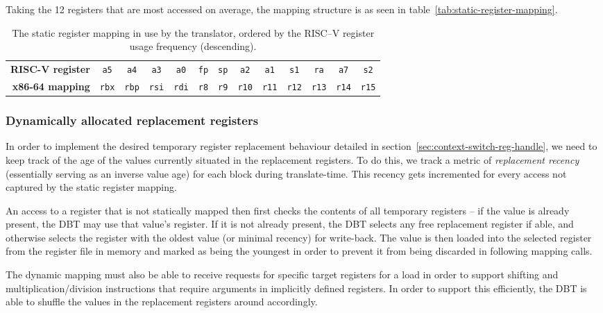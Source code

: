 Taking the 12 registers that are most accessed on average, the mapping structure is as seen in table~\vref{tab:static-register-mapping}.

\begin{table}
	\centering
	\begin{tabular}{rcccccccccccc}
		\toprule
		\textbf{RISC-V register} & \texttt{a5} & \texttt{a4} & \texttt{a3} & \texttt{a0} & \texttt{fp} & \texttt{sp} & \texttt{a2} & \texttt{a1} & \texttt{s1} & \texttt{ra} & \texttt{a7} & \texttt{s2}\\
		\textbf{x86-64 mapping} & \texttt{rbx} & \texttt{rbp} & \texttt{rsi} & \texttt{rdi} & \texttt{r8} & \texttt{r9} & \texttt{r10} & \texttt{r11} & \texttt{r12} & \texttt{r13} & \texttt{r14} & \texttt{r15}\\
		\bottomrule
	\end{tabular}
	\caption[Active static register mapping]%
	{The static register mapping in use by the translator, ordered by the RISC--V register usage frequency (descending).}
	\label{tab:static-register-mapping}
\end{table}

\subsubsection{Dynamically allocated replacement registers}
In order to implement the desired temporary register replacement behaviour detailed in section~\ref{sec:context-switch-reg-handle}, we need to keep track of the age of the values currently situated in the replacement registers.
To do this, we track a metric of \textit{replacement recency} (essentially serving as an inverse value age) for each block during translate-time.
This recency gets incremented for every access not captured by the static register mapping.

An access to a register that is not statically mapped then first checks the contents of all temporary registers -- if the value is already present, the DBT may use that value's register.
If it is not already present, the DBT selects any free replacement register if able, and otherwise selects the register with the oldest value (or minimal recency) for write-back.
The value is then loaded into the selected register from the register file in memory and marked as being the youngest in order to prevent it from being discarded in following mapping calls.

The dynamic mapping must also be able to receive requests for specific target registers for a load in order to support shifting and multiplication/division instructions that require arguments in implicitly defined registers.
In order to support this efficiently, the DBT is able to shuffle the values in the replacement registers around accordingly.

